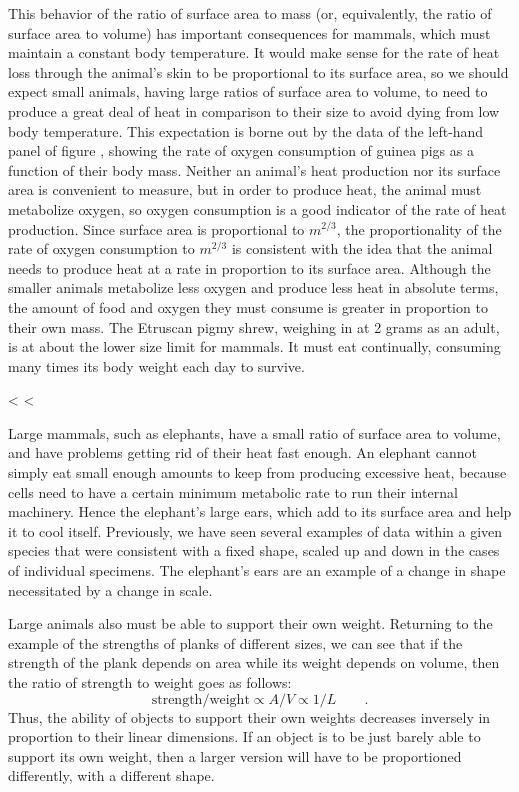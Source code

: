 This behavior of the ratio of surface area to mass (or,
equivalently, the ratio of surface area to volume) has
important consequences for mammals, which must maintain a
constant body temperature. It would make sense for the rate
of heat loss through the animal's skin to be proportional to
its surface area, so we should expect small animals, having
large ratios of surface area to volume, to need to produce a
great deal of heat in comparison to their size to avoid
dying from low body temperature. This expectation is borne
out by the data of the left-hand panel of
figure , showing the rate of
oxygen consumption of guinea pigs as a function of their
body mass. Neither an animal's heat production nor its
surface area is convenient to measure, but in order to
produce heat, the animal must metabolize oxygen, so oxygen
consumption is a good indicator of the rate of heat
production. Since surface area is proportional to $m^{2/3}$, the
proportionality of the rate of oxygen consumption to $m^{2/3}$ is
consistent with the idea that the animal needs to produce
heat at a rate in proportion to its surface area. Although
the smaller animals metabolize less oxygen and produce less
heat in absolute terms, the amount of food and oxygen they
must consume is greater in proportion to their own mass. The
Etruscan pigmy shrew, weighing in at 2 grams as an adult, is
at about the lower size limit for mammals. It must eat
continually, consuming many times its body weight each day to survive.

<%
<%

Large mammals, such as elephants, have a
small ratio of surface area to volume, and have problems
getting rid of their heat fast enough. An elephant cannot
simply eat small enough amounts to keep from producing
excessive heat, because cells need to have a certain minimum
metabolic rate to run their internal machinery. Hence the
elephant's large ears, which add to its surface area and
help it to cool itself. Previously, we have seen several
examples of data within a given species that were consistent
with a fixed shape, scaled up and down in the cases of
individual specimens. The elephant's ears are an example of
a change in shape necessitated by a change in scale.

Large animals also must be able to support their own weight.
Returning to the example of the strengths of planks of
different sizes, we can see that if the strength of the
plank depends on area while its weight depends on volume,
then the ratio of strength to weight goes as follows:
\begin{equation*}
    \text{strength}/\text{weight} \propto A/V \propto 1/L   \qquad   .
\end{equation*}
Thus, the ability of objects to support their own weights
decreases inversely in proportion to their linear dimensions.
If an object is to be just barely able to support its own
weight, then a larger version will have to be proportioned
differently, with a different shape.

